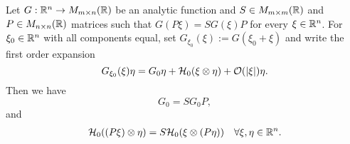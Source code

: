 \begin{lemma}
\label{lem: general symmetries of expansion terms}
Let $G: \mathbb{R}^n \to M_{m \times n}(\mathbb{R})$ be an analytic function and $S \in M_{m \times m}(\mathbb{R})$ and $P \in M_{n \times n}(\mathbb{R})$ matrices such that $G(P \xi) = S G(\xi) P$ for every $\xi \in \mathbb{R}^n$. For $\xi_0 \in \mathbb{R}^n$ with all components equal, set $G_{\xi_0}(\xi) := G(\xi_0 + \xi)$ and write the first order expansion
\begin{equation}
	G_{\xi_0}(\xi)\eta = G_0 \eta + \mathcal{H}_0(\xi \otimes \eta) + \mathcal{O}(|\xi|)\eta.
\end{equation}
Then we have
\begin{equation}
	G_0 = S G_0 P,
\end{equation}
and
\begin{eqnarray}
	\mathcal{H}_0((P \xi) \otimes \eta) = S \mathcal{H}_0(\xi \otimes (P \eta)) &  & \forall \xi, \eta \in \mathbb{R}^n.
\end{eqnarray}
\end{lemma}

